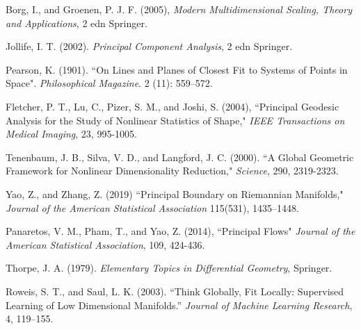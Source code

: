\documentclass[12pt]{report}
\begin{document}
\begin{thebibliography}{9}


Borg, I., and Groenen, P. J. F. (2005),
\textit{Modern Multidimensional Scaling, Theory and Applications}, 
2 edn Springer.

Jollife, I. T. (2002). \textit{Principal Component Analysis}, 
2 edn Springer.

Pearson, K. (1901). ``On Lines and Planes of Closest Fit to Systems of Points in Space". 
\textit{Philosophical Magazine}. 2 (11): 559–572.

Fletcher, P. T., Lu, C., Pizer, S. M., and Joshi, S. (2004), 
``Principal Geodesic Analysis for the Study of Nonlinear Statistics of Shape," 
\textit{IEEE Transactions on Medical Imaging}, 23, 995-1005.

Tenenbaum, J. B., Silva, V. D., and Langford, J. C. (2000). ``A Global
Geometric Framework for Nonlinear Dimensionality Reduction," 
\textit{Science}, 290, 2319-2323.

Yao, Z., and Zhang, Z. (2019) ``Principal Boundary on Riemannian Manifolds," 
\textit{Journal of the American Statistical Association} 115(531), 1435–1448.

Panaretos, V. M., Pham, T., and Yao, Z. (2014), 
``Principal Flows" \textit{Journal of the American
Statistical Association}, 109, 424-436.

Thorpe, J. A. (1979). \textit{Elementary Topics in Differential Geometry},
Springer.

Roweis, S. T., and Saul, L. K. (2003). ``Think Globally, Fit Locally:
Supervised Learning of Low Dimensional Manifolds.” \textit{Journal of Machine
Learning Research}, 4, 119–155.

\end{thebibliography}
\end{document}
